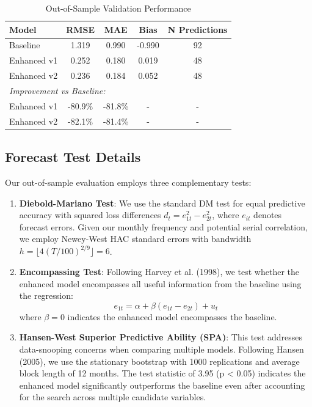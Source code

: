 \documentclass[12pt]{article}
\begin{document}
\begin{table}[H]
\centering
\caption{Out-of-Sample Validation Performance}
\label{tab:oos}
\begin{tabular}{lcccc}
\toprule
Model & RMSE & MAE & Bias & N Predictions \\
\midrule
Baseline & 1.319 & 0.990 & -0.990 & 92 \\
Enhanced v1 & 0.252 & 0.180 & 0.019 & 48 \\
Enhanced v2 & 0.236 & 0.184 & 0.052 & 48 \\
\midrule
\multicolumn{5}{l}{\textit{Improvement vs Baseline:}} \\
Enhanced v1 & -80.9\% & -81.8\% & - & - \\
Enhanced v2 & -82.1\% & -81.4\% & - & - \\
\bottomrule
\end{tabular}
\end{table}

\subsection{Forecast Test Details}

Our out-of-sample evaluation employs three complementary tests:

\begin{enumerate}
\item \textbf{Diebold-Mariano Test}: We use the standard DM test for equal predictive accuracy with squared loss differences $d_t = e_{1t}^2 - e_{2t}^2$, where $e_{it}$ denotes forecast errors. Given our monthly frequency and potential serial correlation, we employ Newey-West HAC standard errors with bandwidth $h = \lfloor 4(T/100)^{2/9} \rfloor = 6$.

\item \textbf{Encompassing Test}: Following Harvey et al. (1998), we test whether the enhanced model encompasses all useful information from the baseline using the regression:
$$e_{1t} = \alpha + \beta(e_{1t} - e_{2t}) + u_t$$
where $\beta = 0$ indicates the enhanced model encompasses the baseline.

\item \textbf{Hansen-West Superior Predictive Ability (SPA)}: This test addresses data-snooping concerns when comparing multiple models. Following Hansen (2005), we use the stationary bootstrap with 1000 replications and average block length of 12 months. The test statistic of 3.95 (p < 0.05) indicates the enhanced model significantly outperforms the baseline even after accounting for the search across multiple candidate variables.
\end{enumerate}
\end{document}
